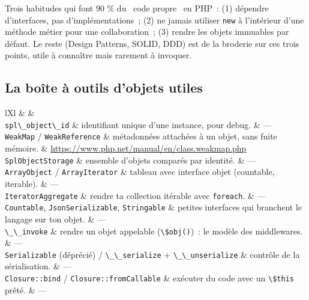 \begin{astuce}
Trois habitudes qui font 90 \% du \og ~code propre~ \fg{} en PHP~: (1) d\'ependre d'interfaces, pas
d'impl\'ementations~; (2) ne jamais utiliser \verb|new| \`a l'int\'erieur d'une m\'ethode m\'etier pour une
collaboration~; (3) rendre les objets immuables par d\'efaut. Le reste (Design Patterns, SOLID,
DDD) est de la broderie sur ces trois points, utile \`a conna\^itre mais rarement \`a invoquer.
\end{astuce}

\subsection{La bo\^ite \`a outils d'objets utiles}

\begin{tabz}{lXl}
  \headrow {} \&  \&  \\
  \midrule
  \verb|spl\_object\_id| \& identifiant unique d'une instance, pour debug. \& --- \\
  \verb|WeakMap| / \verb|WeakReference| \& m\'etadonn\'ees attach\'ees \`a un objet, sans fuite m\'emoire. \& \url{https://www.php.net/manual/en/class.weakmap.php} \\
  \verb|SplObjectStorage| \& ensemble d'objets compar\'es par identit\'e. \& --- \\
  \verb|ArrayObject| / \verb|ArrayIterator| \& tableau avec interface objet (countable, iterable). \& --- \\
  \verb|IteratorAggregate| \& rendre ta collection it\'erable avec \verb|foreach|. \& --- \\
  \verb|Countable|, \verb|JsonSerializable|, \verb|Stringable| \& petites interfaces qui branchent le langage sur ton objet. \& --- \\
  \verb|\_\_invoke| \& rendre un objet appelable (\verb|\$obj()|)~: le mod\`ele des middlewares. \& --- \\
  \verb|Serializable| (d\'epr\'eci\'e) / \verb|\_\_serialize| + \verb|\_\_unserialize| \& contr\^ole de la s\'erialisation. \& --- \\
  \verb|Closure::bind| / \verb|Closure::fromCallable| \& ex\'ecuter du code avec un \verb|\$this| pr\^et\'e. \& --- \\
\end{tabz}

